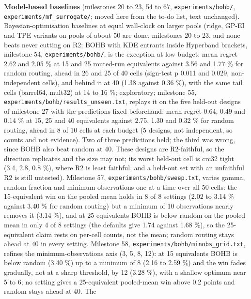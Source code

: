 \documentclass[conference]{IEEEtran}
\begin{document}
\textbf{Model-based baselines} (milestones 20 to 23, 54 to 67,
\texttt{experiments/\allowbreak{}bohb/\allowbreak{}}, \texttt{experiments/\allowbreak{}mf\_\allowbreak{}surrogate/\allowbreak{}}; moved
here from the to-do list, text unchanged). Bayesian-optimisation
baselines at equal wall-clock on larger pools (ridge, GP-EI and TPE
variants on pools of about 50 are done, milestones 20 to 23, and none
beats never cutting on R2; BOHB with KDE entrants inside Hyperband
brackets, milestone 54, \texttt{experiments/\allowbreak{}bohb/\allowbreak{}}, is the exception at
low budget: mean regret 2.62 and 2.05 \% at 15 and 25 routed-run
equivalents against 3.56 and 1.77 \% for random routing, ahead in 26 and
25 of 40 cells (sign-test p 0.011 and 0.029, non-independent cells), and
behind it at 40 (1.38 against 0.36 \%), with the same tail cells
(barrel64, mult32) at 14 to 16 \%; exploratory; milestone 55,
\texttt{experiments/\allowbreak{}bohb/\allowbreak{}results\_\allowbreak{}unseen.txt}, replays it on the five
held-out designs of milestone 27 with the predictions fixed beforehand:
mean regret 0.64, 0.49 and 0.14 \% at 15, 25 and 40 equivalents against
2.75, 1.30 and 0.32 \% for random routing, ahead in 8 of 10 cells at
each budget (5 designs, not independent, so counts and not evidence).
Two of three predictions held; the third was wrong, since BOHB also beat
random at 40. These designs are R2-faithful, so the direction replicates
and the size may not; its worst held-out cell is crc32 tight (3.4, 2.8,
0.8 \%), where R2 is least faithful, and a held-out set with an
unfaithful R2 is still untested). Milestone 57,
\texttt{experiments/\allowbreak{}bohb/\allowbreak{}sweep.txt}, varies gamma, random fraction and
minimum observations one at a time over all 50 cells: the 15-equivalent
win on the pooled mean holds in 8 of 8 settings (2.02 to 3.14 \% against
3.40 \% for random routing) but a minimum of 10 observations nearly
removes it (3.14 \%), and at 25 equivalents BOHB is below random on the
pooled mean in only 4 of 8 settings (the defaults give 1.74 against 1.68
\%), so the 25-equivalent claim rests on per-cell counts, not the mean;
random routing stays ahead at 40 in every setting. Milestone 58,
\texttt{experiments/\allowbreak{}bohb/\allowbreak{}minobs\_\allowbreak{}grid.txt}, refines the
minimum-observations axis (3, 5, 8, 12): at 15 equivalents BOHB is below
random (3.40 \%) up to a minimum of 8 (2.16 to 2.59 \%) and the win
fades gradually, not at a sharp threshold, by 12 (3.28 \%), with a
shallow optimum near 5 to 6; no setting gives a 25-equivalent
pooled-mean win above 0.2 points and random stays ahead at 40. The
\end{document}
